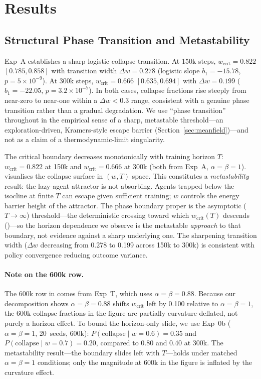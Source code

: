 \documentclass[letterpaper]{article}
\theoremstyle{plain}
\newcommand{\wcrit}{w_{\mathrm{crit}}}
\begin{document}
\section{Results}
\label{sec:results}

\subsection{Structural Phase Transition and Metastability}
\label{sec:results_structural}

Exp~A establishes a sharp logistic collapse transition.
At 150k steps, $\wcrit = 0.822$ $[0.785, 0.858]$ with transition width
$\Delta w = 0.278$ (logistic slope $b_1 = -15.78$, $p = 5 \times 10^{-9}$).
At 300k steps, $\wcrit = 0.666$ $[0.635, 0.694]$ with $\Delta w = 0.199$
($b_1 = -22.05$, $p = 3.2 \times 10^{-7}$).
In both cases, collapse fractions rise steeply from near-zero to near-one
within a $\Delta w < 0.3$ range, consistent with a genuine phase
transition rather than a gradual degradation.
We use ``phase transition'' throughout in the empirical sense of a sharp,
metastable threshold---an exploration-driven, Kramers-style escape barrier
(Section~\ref{sec:meanfield})---and not as a claim of a thermodynamic-limit
singularity.

The critical boundary decreases monotonically with training horizon $T$:
$\wcrit = 0.822$ at 150k and $\wcrit = 0.666$ at 300k (both from Exp~A,
$\alpha{=}\beta{=}1$).
 visualises the collapse surface in $(w, T)$ space.
This constitutes a \emph{metastability} result: the lazy-agent attractor
is not absorbing.
Agents trapped below the isocline at finite $T$ can escape given
sufficient training; $w$ controls the energy barrier height of the
attractor.
The phase boundary proper is the asymptotic ($T\!\to\!\infty$) threshold---the
deterministic crossing toward which $\wcrit(T)$ descends ()---so
the horizon dependence we observe is the metastable \emph{approach} to that
boundary, not evidence against a sharp underlying one.
The sharpening transition width ($\Delta w$ decreasing from 0.278 to
0.199 across 150k to 300k) is consistent with policy convergence reducing
outcome variance.

\paragraph{Note on the 600k row.}
The 600k row in  comes from Exp~T, which uses
$\alpha{=}\beta{=}0.88$.
Because our decomposition shows $\alpha{=}\beta{=}0.88$ shifts
$\wcrit$ left by 0.100 relative to $\alpha{=}\beta{=}1$, the 600k
collapse fractions in the figure are partially curvature-deflated, not
purely a horizon effect.
To bound the horizon-only slide, we use Exp~0b ($\alpha{=}\beta{=}1$,
20~seeds, 600k): $P(\mathrm{collapse}\mid w{=}0.6) = 0.35$ and
$P(\mathrm{collapse}\mid w{=}0.7) = 0.20$, compared to 0.80 and 0.40
at 300k.
The metastability result---the boundary slides left with $T$---holds
under matched $\alpha{=}\beta{=}1$ conditions; only the magnitude at
600k in the figure is inflated by the curvature effect.
\end{document}
